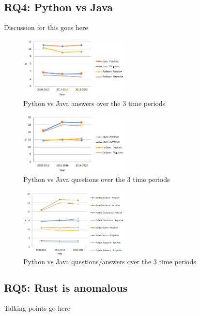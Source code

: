 \documentclass[conference]{IEEEtran}
\begin{document}
\subsection{RQ4: Python vs Java}
Discussion for this goes here

\begin{figure}[htbp]
\centerline{\includegraphics[width=0.49\textwidth]{figures/Java-python-answers.png}}
\caption{Python vs Java answers over the 3 time periods}
\label{fig}
\end{figure}

\begin{figure}[htbp]
\centerline{\includegraphics[width=0.49\textwidth]{figures/Java-python-questions.png}}
\caption{Python vs Java questions over the 3 time periods}
\label{fig}
\end{figure}

\begin{figure}[htbp]
\centerline{\includegraphics[width=0.49\textwidth]{figures/Java-python-combined.png}}
\caption{Python vs Java questions/answers over the 3 time periods}
\label{fig}
\end{figure}

\subsection{RQ5: Rust is anomalous}
Talking points go here
\end{document}
